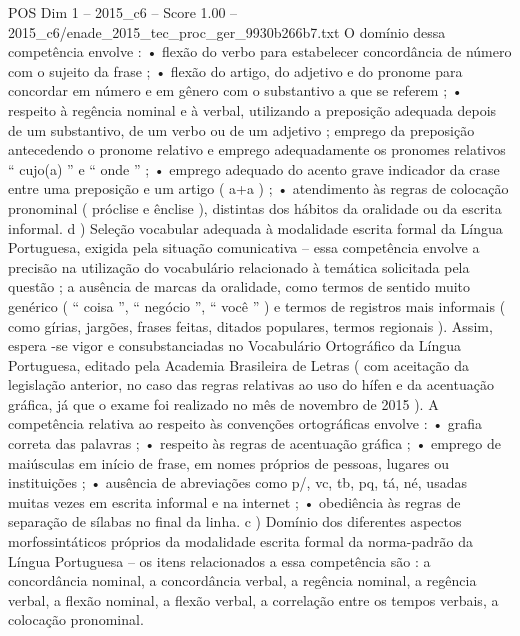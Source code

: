 \begin{textsample}{POS Dim 1 – 2015\_c6 – Score 1.00 – 2015\_c6/enade\_2015\_tec\_proc\_ger\_9930b266b7.txt}
O domínio dessa competência envolve : • flexão do verbo para estabelecer concordância de número com o sujeito da frase ; • flexão do artigo, do adjetivo e do pronome para concordar em número e em gênero com o substantivo a que se referem ; • respeito à regência nominal e à verbal, utilizando a preposição adequada depois de um substantivo, de um verbo ou de um adjetivo ; emprego da preposição antecedendo o pronome relativo e emprego adequadamente os pronomes relativos “ cujo(a) ” e “ onde ” ; • emprego adequado do acento grave indicador da crase entre uma preposição e um artigo ( a+a ) ; • atendimento às regras de colocação pronominal ( próclise e ênclise ), distintas dos hábitos da oralidade ou da escrita informal. d ) Seleção vocabular adequada à modalidade escrita formal da Língua Portuguesa, exigida pela situação comunicativa – essa competência envolve a precisão na utilização do vocabulário relacionado à temática solicitada pela questão ; a ausência de marcas da oralidade, como termos de sentido muito genérico ( “ coisa ”, “ negócio ”, “ você ” ) e termos de registros mais informais ( como gírias, jargões, frases feitas, ditados populares, termos regionais ).
Assim, espera -se vigor e consubstanciadas no Vocabulário Ortográfico da Língua Portuguesa, editado pela Academia Brasileira de Letras ( com aceitação da legislação anterior, no caso das regras relativas ao uso do hífen e da acentuação gráfica, já que o exame foi realizado no mês de novembro de 2015 ).
A competência relativa ao respeito às convenções ortográficas envolve : • grafia correta das palavras ; • respeito às regras de acentuação gráfica ; • emprego de maiúsculas em início de frase, em nomes próprios de pessoas, lugares ou instituições ; • ausência de abreviações como p/, vc, tb, pq, tá, né, usadas muitas vezes em escrita informal e na internet ; • obediência às regras de separação de sílabas no final da linha. c ) Domínio dos diferentes aspectos morfossintáticos próprios da modalidade escrita formal da norma-padrão da Língua Portuguesa – os itens relacionados a essa competência são : a concordância nominal, a concordância verbal, a regência nominal, a regência verbal, a flexão nominal, a flexão verbal, a correlação entre os tempos verbais, a colocação pronominal.

\end{textsample}
